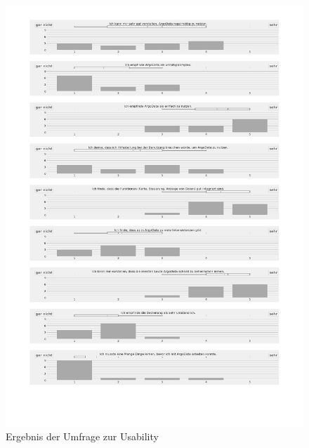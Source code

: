 \begin{figure}
 \centering
 \includegraphics[width=\textwidth,height=0.98\textheight,clip=true,trim=2cm 3cm 1.6cm 1cm]{pix/surveyAuswertung.pdf}

 \label{fig:surveyAuswertung}
 \caption{Ergebnis der Umfrage zur Usability}
\end{figure}
